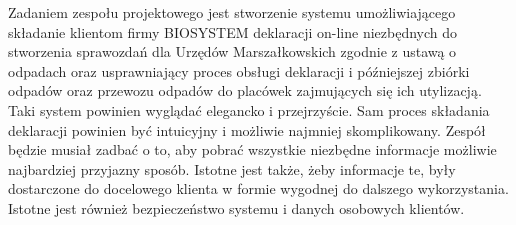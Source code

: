 

Zadaniem zespołu projektowego jest stworzenie systemu umożliwiającego składanie klientom firmy BIOSYSTEM deklaracji on-line niezbędnych do stworzenia sprawozdań dla Urzędów Marszałkowskich zgodnie z ustawą o odpadach oraz usprawniający proces obsługi deklaracji i późniejszej zbiórki odpadów oraz przewozu odpadów do placówek zajmujących się ich utylizacją.
Taki system powinien wyglądać elegancko i przejrzyście. Sam proces składania deklaracji powinien być intuicyjny i możliwie najmniej skomplikowany. Zespół będzie musiał zadbać o to, aby pobrać wszystkie niezbędne informacje możliwie najbardziej przyjazny sposób. Istotne jest także, żeby informacje te, były dostarczone do docelowego klienta w formie wygodnej do dalszego wykorzystania.
Istotne jest również bezpieczeństwo systemu i danych osobowych klientów. 